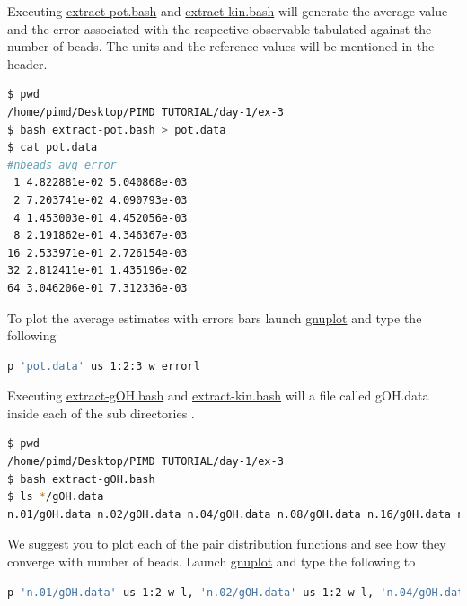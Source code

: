 \documentclass{article}
\begin{document}
\begin{Exercise}[label={basic},title={Benchmark of quantum effects in a water molecule}]
\Question
Executing \url{extract-pot.bash} and \url{extract-kin.bash} will generate the average value and the error associated with the respective observable tabulated against the number of beads. The units and the reference values will be mentioned in the header. 
\begin{lstlisting}[language=bash]
$ pwd
/home/pimd/Desktop/PIMD TUTORIAL/day-1/ex-3
$ bash extract-pot.bash > pot.data
$ cat pot.data
#nbeads avg error
 1 4.822881e-02 5.040868e-03
 2 7.203741e-02 4.090793e-03
 4 1.453003e-01 4.452056e-03
 8 2.191862e-01 4.346367e-03
16 2.533971e-01 2.726154e-03
32 2.812411e-01 1.435196e-02
64 3.046206e-01 7.312336e-03
\end{lstlisting}
To plot the average estimates with errors bars launch \url{gnuplot} and type the following
\begin{lstlisting}[language=bash]
p 'pot.data' us 1:2:3 w errorl
\end{lstlisting}

\Question
Executing \url{extract-gOH.bash} and \url{extract-kin.bash} will a file called gOH.data inside each of the sub directories .
\begin{lstlisting}[language=bash]
$ pwd
/home/pimd/Desktop/PIMD TUTORIAL/day-1/ex-3
$ bash extract-gOH.bash
$ ls */gOH.data  
n.01/gOH.data n.02/gOH.data n.04/gOH.data n.08/gOH.data n.16/gOH.data n.32/gOH.data n.64/gOH.data
\end{lstlisting}
We suggest you to plot each of the pair distribution functions and see how they converge with number of beads. Launch \url{gnuplot} and type the following to

\begin{lstlisting}[language=bash]
p 'n.01/gOH.data' us 1:2 w l, 'n.02/gOH.data' us 1:2 w l, 'n.04/gOH.data' us 1:2 w l, 'n.08/gOH.data' us 1:2 w l, 'n.16/gOH.data' us 1:2 w l, 'n.32/gOH.data' us 1:2 w l, 'n.64/gOH.data' us 1:2 w l
\end{lstlisting}

\end{Exercise}
\end{document}
